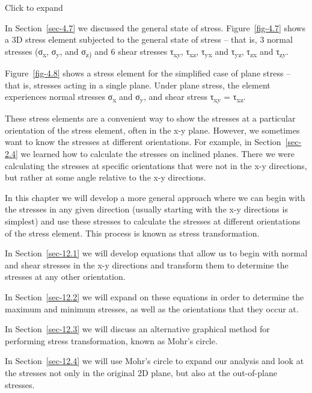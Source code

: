 \documentclass[
  letterpaper,
  DIV=11,
  numbers=noendperiod]{scrreprt}
\theoremstyle{definition}
\theoremstyle{remark}
\begin{document}

Click to expand

In Section~\ref{sec-4.7} we discussed the general state of stress.
Figure~\ref{fig-4.7} shows a 3D stress element subjected to the general
state of stress -- that is, 3 normal stresses (σ\textsubscript{x},
σ\textsubscript{y}, and σ\textsubscript{z)} and 6 shear stresses
τ\textsubscript{xy}, τ\textsubscript{xz}, τ\textsubscript{yx} and
τ\textsubscript{yz}, τ\textsubscript{zx} and τ\textsubscript{zy}.

Figure~\ref{fig-4.8} shows a stress element for the simplified case of
plane stress -- that is, stresses acting in a single plane. Under plane
stress, the element experiences normal stresses σ\textsubscript{x} and
σ\textsubscript{y}, and shear stress τ\textsubscript{xy} =
τ\textsubscript{xz}.

These stress elements are a convenient way to show the stresses at a
particular orientation of the stress element, often in the x-y plane.
However, we sometimes want to know the stresses at different
orientations. For example, in Section~\ref{sec-2.4} we learned how to
calculate the stresses on inclined planes. There we were calculating the
stresses at specific orientations that were not in the x-y directions,
but rather at some angle relative to the x-y directions.

In this chapter we will develop a more general approach where we can
begin with the stresses in any given direction (usually starting with
the x-y directions is simplest) and use these stresses to calculate the
stresses at different orientations of the stress element. This process
is known as stress transformation.

In Section~\ref{sec-12.1} we will develop equations that allow us to
begin with normal and shear stresses in the x-y directions and transform
them to determine the stresses at any other orientation.

In Section~\ref{sec-12.2} we will expand on these equations in order to
determine the maximum and minimum stresses, as well as the orientations
that they occur at.

In Section~\ref{sec-12.3} we will discuss an alternative graphical
method for performing stress transformation, known as Mohr's circle.

In Section~\ref{sec-12.4} we will use Mohr's circle to expand our
analysis and look at the stresses not only in the original 2D plane, but
also at the out-of-plane stresses.
\end{document}
